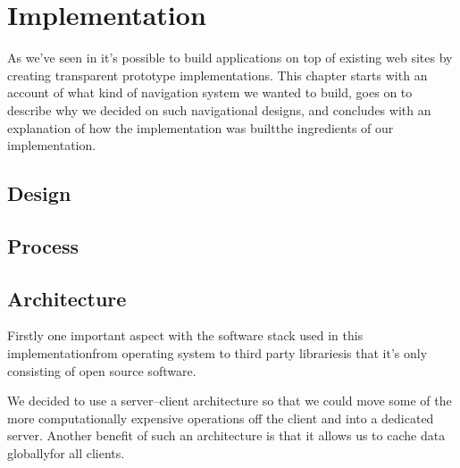 \chapter{Implementation}
\label{chapter:implementation}


As we've seen in 
it's possible to build applications on top of existing web sites by creating
transparent prototype implementations. This chapter starts with an account of
what kind of navigation system we wanted to build, goes on to describe why we
decided on such navigational designs, and concludes with an explanation of how
the implementation was built\dash{}the ingredients of our implementation.

\section{Design}

\section{Process}

\section{Architecture}

Firstly one important aspect with the software stack used in this
implementation\dash{}from operating system to third party libraries\dash{}is
that it's only consisting of open source software.

We decided to use a server--client architecture so that we could move some of
the more computationally expensive operations off the client and into a
dedicated server. Another benefit of such an architecture is that it allows us
to cache data globally\dash{}for all clients.

